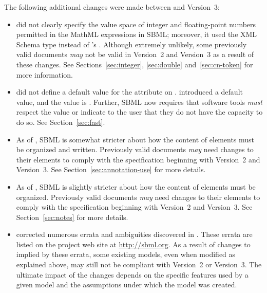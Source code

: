 The following additional changes were made between \sbmltwoone and
Version~3:
\begin{itemize}

\item \sbmltwoone did not clearly specify the value space of
  integer and floating-point numbers permitted in the MathML
  expressions in SBML; moreover, it used the XML Schema type
   instead of \sbmltwotwo's .  Although
  extremely unlikely, some previously valid \sbmltwoone documents
  \emph{may} not be valid in Version~2 and Version~3 as a result
  of these changes.  See Sections~\ref{sec:integer},
  \ref{sec:double} and~\ref{sec:cn-token} for more information.

\item \sbmltwoone did not define a default value for the attribute
   on \Reaction.  \sbmltwotwo introduced a default
  value, and the value is .  Further, SBML now requires
  that software tools \emph{must} respect the value or indicate to
  the user that they do not have the capacity to do so.  See
  Section~\ref{sec:fast}.
  
\item As of \sbmltwotwo, SBML is somewhat stricter about how the
  content of  elements must be organized and
  written.  Previously valid \sbmltwoone documents \emph{may}
  need changes to their  elements to comply with
  the specification beginning with Version~2 and Version~3.  See
  Section~\ref{sec:annotation-use} for more details.
  
\item As of \sbmltwotwo, SBML is slightly stricter about how the
  content of  elements must be organized.  Previously
  valid \sbmltwoone documents \emph{may} need changes to their
   elements to comply with the specification
  beginning with Version~2 and Version~3.  See
  Section~\ref{sec:notes} for more details.
  
\item \sbmltwotwo corrected numerous errata and ambiguities
  discovered in \sbmltwoone.  These errata are listed on the
  project web site at \url{http://sbml.org}.  As a result of
  changes to \sbmltwo implied by these errata, some existing
  \sbmltwoone models, even when modified as explained above, may
  still not be compliant with Version~2 or Version~3.  The
  ultimate impact of the changes depends on the specific features
  used by a given model and the assumptions under which the model
  was created.

\end{itemize}




